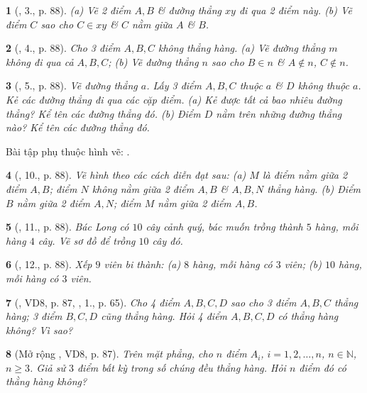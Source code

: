 \documentclass{article}
\newtheorem{baitoan}{}
\begin{document}
\begin{baitoan}[\cite{SBT_Toan_6_Canh_Dieu_tap_2}, 3., p. 88]
	(a) Vẽ 2 điểm $A,B$ \& đường thẳng $xy$ đi qua 2 điểm này. (b) Vẽ điểm $C$ sao cho $C\in xy$ \& $C$ nằm giữa $A$ \& $B$.
\end{baitoan}

\begin{baitoan}[\cite{SBT_Toan_6_Canh_Dieu_tap_2}, 4., p. 88]
	Cho 3 điểm $A,B,C$ không thẳng hàng. (a) Vẽ đường thẳng $m$ không đi qua cả $A,B,C$; (b) Vẽ đường thẳng $n$ sao cho $B\in n$ \& $A\notin n$, $C\notin n$.
\end{baitoan}

\begin{baitoan}[\cite{SBT_Toan_6_Canh_Dieu_tap_2}, 5., p. 88]
	Vẽ đường thẳng $a$. Lấy 3 điểm $A,B,C$ thuộc $a$ \& $D$ không thuộc $a$. Kẻ các đường thẳng đi qua các cặp điểm. (a) Kẻ được tất cả bao nhiêu đường thẳng? Kể tên các đường thẳng đó. (b) Điểm $D$ nằm trên những đường thẳng nào? Kể tên các đường thẳng đó.
\end{baitoan}
Bài tập phụ thuộc hình vẽ: \cite[\textbf{6.--9.}, p. 89]{SBT_Toan_6_Canh_Dieu_tap_2}.

\begin{baitoan}[\cite{SBT_Toan_6_Canh_Dieu_tap_2}, 10., p. 88]
	Vẽ hình theo các cách diễn đạt sau: (a) $M$ là điểm nằm giữa 2 điểm $A,B$; điểm $N$ không nằm giữa 2 điểm $A,B$ \& $A,B,N$ thẳng hàng. (b) Điểm $B$ nằm giữa 2 điểm $A,N$; điểm $M$ nằm giữa 2 điểm $A,B$.
\end{baitoan}

\begin{baitoan}[\cite{SBT_Toan_6_Canh_Dieu_tap_2}, 11., p. 88]
	Bác Long có $10$ cây cảnh quý, bác muốn trồng thành $5$ hàng, mỗi hàng $4$ cây. Vẽ sơ đồ để trồng $10$ cây đó.
\end{baitoan}

\begin{baitoan}[\cite{SBT_Toan_6_Canh_Dieu_tap_2}, 12., p. 88]
	Xếp $9$ viên bi thành: (a) $8$ hàng, mỗi hàng có $3$ viên; (b) $10$ hàng, mỗi hàng có $3$ viên.
\end{baitoan}

\begin{baitoan}[\cite{Tuyen_Toan_6}, VD8, p. 87, \cite{Binh_Toan_6_tap_2}, 1., p. 65]
	Cho 4 điểm $A,B,C,D$ sao cho 3 điểm $A,B,C$ thẳng hàng; 3 điểm $B,C,D$ cũng thẳng hàng. Hỏi 4 điểm $A,B,C,D$ có thẳng hàng không? Vì sao?
\end{baitoan}

\begin{baitoan}[Mở rộng \cite{Tuyen_Toan_6}, VD8, p. 87]
	Trên mặt phẳng, cho $n$ điểm $A_i$, $i = 1,2,\ldots,n$, $n\in\mathbb{N}$, $n\ge3$. Giả sử $3$ điểm bất kỳ trong số chúng đều thẳng hàng. Hỏi $n$ điểm đó có thằng hàng không?
\end{baitoan}
\end{document}
